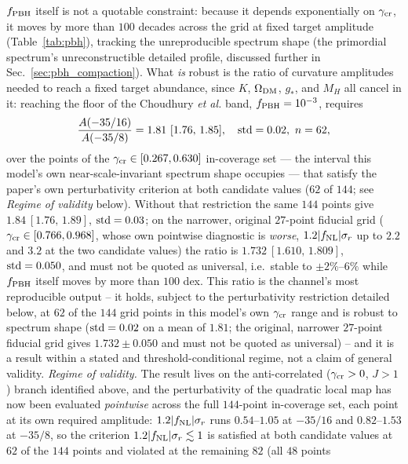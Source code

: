 \documentclass[aps,prd,twocolumn,superscriptaddress,nofootinbib,longbibliography]{revtex4-2}
\newcommand{\fnl}{f_{\rm NL}}
\newcommand{\fpbh}{f_{\rm PBH}}
\begin{document}
$\fpbh$ itself is not a quotable constraint: because it depends exponentially
on $\gamma_{\rm cr}$, it moves by more than $100$ decades across the grid at
fixed target amplitude (Table~\ref{tab:pbh}), tracking the unreproducible
spectrum shape (the primordial spectrum's unreconstructible detailed profile, discussed further in Sec.~\ref{sec:pbh_compaction}). What \emph{is} robust is the ratio of
curvature amplitudes needed to reach a fixed target abundance, since $K$,
$\Omega_{\rm DM}$, $g_*$, and $M_H$ all cancel in it: reaching the floor of the
Choudhury \textit{et al.} band, $\fpbh = 10^{-3}$, requires
\begin{equation}
  \frac{A(-35/16)}{A(-35/8)} = 1.81~[1.76,\,1.85],\quad {\rm std}=0.02,\ n=62,
  \label{eq:pbh_ratio}
\end{equation}
over the points of the $\gamma_{\rm cr}\in[0.267,0.630]$ in-coverage set --- the interval this model's
own near-scale-invariant spectrum shape occupies --- that satisfy the paper's own perturbativity
criterion at both candidate values ($62$ of $144$; see \emph{Regime of validity} below). Without that
restriction the same $144$ points give $1.84~[1.76,\,1.89]$, ${\rm std}=0.03$; on the narrower,
original $27$-point fiducial grid ($\gamma_{\rm cr}\in[0.766,0.968]$, whose own pointwise diagnostic is
\emph{worse}, $1.2|\fnl|\sigma_r$ up to $2.2$ and $3.2$ at the two candidate values) the ratio is
$1.732~[1.610,\,1.809]$, ${\rm std}=0.050$, and must not be quoted as universal, i.e.\ stable to
$\pm2\%$--$6\%$ while $\fpbh$ itself moves by more than $100$ dex. This
ratio is the channel's most reproducible output -- it holds, subject to the perturbativity
restriction detailed below, at $62$ of the $144$ grid points in this model's own $\gamma_{\rm cr}$
range and is robust to spectrum shape ($\rm std=0.02$ on a mean of $1.81$; the original,
narrower $27$-point fiducial grid gives $1.732\pm0.050$ and must not be
quoted as universal) -- and it is a result within a stated and threshold-conditional regime, not a
claim of general validity. \emph{Regime of validity.} The result lives on the anti-correlated
($\gamma_{\rm cr}>0$, $J>1$) branch identified above, and the perturbativity of the quadratic local
map has now been evaluated \emph{pointwise} across the full $144$-point in-coverage set, each point
at its own required amplitude: $1.2|\fnl|\sigma_r$ runs $0.54$--$1.05$ at $-35/16$ and
$0.82$--$1.53$ at $-35/8$, so the criterion $1.2|\fnl|\sigma_r\lesssim1$ is satisfied at both
candidate values at $62$ of the $144$ points and violated at the remaining $82$ (all $48$ points
\end{document}
